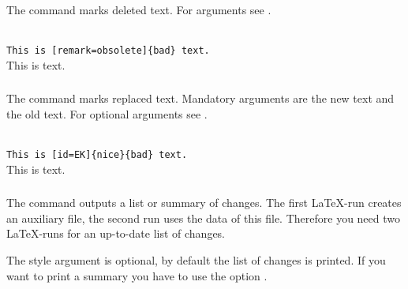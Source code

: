 \subsubsection{}
\DescribeMacro{\deleted}

The command  marks deleted text.
For arguments see .

\begin{chusage}
		\>\\
	\usageexample
		\>\texttt{This is [remark=obsolete]\{bad\} text.}\\
		\>This is  text.
\end{chusage}


\subsubsection{}
\DescribeMacro{\replaced}

The command  marks replaced text.
Mandatory arguments are the new text and the old text.
For optional arguments see .

\begin{chusage}
		\>\\
	\usageexample
		\>\texttt{This is [id=EK]\{nice\}\{bad\} text.}\\
		\>This is  text.
\end{chusage}



\subsubsection{}
\DescribeMacro{\listofchanges}

The command  outputs a list or summary of changes.
The first \LaTeX-run creates an auxiliary file, the second run uses the data of this file.
Therefore you need two \LaTeX-runs for an up-to-date list of changes.

The style argument is optional, by default the list of changes is printed.
If you want to print a summary you have to use the option .

